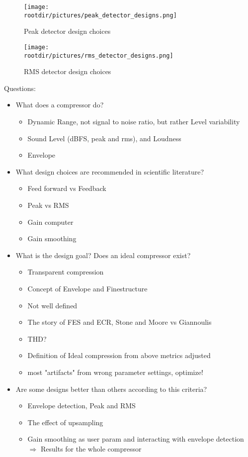 \documentclass[../main2.tex]{subfiles}
\providecommand{\rootdir}{..}
\begin{document}
\begin{figure}
\centerline{
	\texttt{[image: \\rootdir/pictures/peak\_detector\_designs.png]}
}
\caption{Peak detector design choices}
\label{fig:peak_detector_design}
\end{figure}

\begin{figure}
\centerline{
	\texttt{[image: \\rootdir/pictures/rms\_detector\_designs.png]}
}
\caption{RMS detector design choices}
\label{fig:rms_detector_design}
\end{figure}

Questions:
\begin{itemize}
\item What does a compressor do?
	\begin{itemize}
	\item Dynamic Range, not signal to noise ratio, but rather Level variability
	\item Sound Level (dBFS, peak and rms), and Loudness
	\item Envelope
	\end{itemize}
	
\item What design choices are recommended in scientific literature?
	\begin{itemize}
	\item Feed forward vs Feedback
	\item Peak vs RMS
	\item Gain computer
	\item Gain smoothing
	\end{itemize}
	
\item What is the design goal? Does an ideal compressor exist?
	\begin{itemize}
	\item Transparent compression
	\item Concept of Envelope and Finestructure
	\item Not well defined
	\item The story of FES and ECR, Stone and Moore vs Giannoulis
	\item THD?
	\item Definition of Ideal compression from above metrics adjusted
	\item most "artifacts" from wrong parameter settings, optimize!
	\end{itemize}
	
\item Are some designs better than others according to this criteria?
	\begin{itemize}
	\item Envelope detection, Peak and RMS
	\item The effect of upsampling
	\item Gain smoothing as user param and interacting with envelope detection $\Rightarrow$ Results for the whole compressor
	\end{itemize}

\end{itemize}
\end{document}
